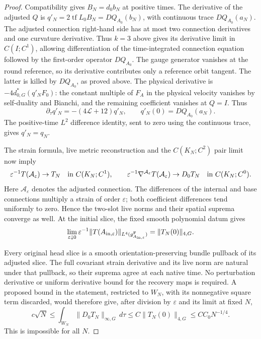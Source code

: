 \documentclass[11pt]{article}
\numberwithin{equation}{section}
\theoremstyle{definition}
\theoremstyle{remark}
\begin{document}
\begin{proof}
Compatibility gives \(B_N=d_0b_N\) at positive times.
The derivative of the adjusted \(Q\) is
\(q'_N=2\operatorname{tf}L_0B_N=DQ_{A_0}(b_N)\), with
continuous trace \(DQ_{A_0}(a_N)\).
The adjusted connection right-hand side has at most two connection
derivatives and one curvature derivative. Thus \(k=3\)
above gives its derivative limit in \(C(I;C^1)\), allowing
differentiation of the time-integrated connection equation
followed by the first-order operator \(DQ_{A_0}\).
The gauge generator vanishes at the round reference, so
its derivative contributes only a reference orbit tangent.
The latter is killed by \(DQ_{A_0}\), as proved above.
The physical derivative is \(-4d_{0,G}^*(q'_NF_0)\):
the constant multiple of \(F_A\) in the physical velocity
vanishes by self-duality and Bianchi, and the remaining
coefficient vanishes at \(Q=I\).
Thus
\[
 \partial_\tau q'_N=-(4\mathcal L+12)q'_N,\qquad
 q'_N(0)=DQ_{A_0}(a_N).
\]
The positive-time \(L^2\) difference identity, sent to zero
using the continuous trace, gives \(q'_N=q_N\).

The strain formula, live metric reconstruction and the
\(C(K_N;C^2)\) pair limit now imply
\[
 \varepsilon^{-1}T(\mathcal A_\varepsilon)\to T_N
                      \quad\hbox{in }C(K_N;C^1),\qquad
 \varepsilon^{-1}\nabla^{\mathcal A_\varepsilon}
                   T(\mathcal A_\varepsilon)\to D_0T_N
                      \quad\hbox{in }C(K_N;C^0).
\]
Here \(\mathcal A_\varepsilon\) denotes the adjusted connection.
The differences of the internal and base connections multiply
a strain of order \(\varepsilon\); both coefficient differences
tend uniformly to zero. Hence the two-slot live norms and
their spatial suprema converge as well.
At the initial slice, the fixed smooth polynomial datum gives
\[
 \lim_{\varepsilon\downarrow0}
 \varepsilon^{-1}\|T(A_{{\rm in},\varepsilon})\|
                         _{L^4(g^{\rm F}_{A_{{\rm in},\varepsilon}})}
 =\|T_N(0)\|_{4,G}.
\]

Every original head slice is a smooth orientation-preserving
bundle pullback of its adjusted slice.
The full covariant strain derivative and its live norm are
natural under that pullback, so their suprema agree at each
native time. No perturbation derivative or uniform derivative
bound for the recovery maps is required.
A proposed bound in the statement, restricted to \(W_N\),
with its nonnegative square term discarded, would therefore give,
after division by \(\varepsilon\) and its limit at fixed \(N\),
\[
 c\sqrt N
 \le\int_{W_N}\|D_0T_N\|_{\infty,G}\,d\tau
 \le C\|T_N(0)\|_{4,G}
 \le C C_0 N^{-1/4}.
\]
This is impossible for all \(N\).
\end{proof}
\end{document}
